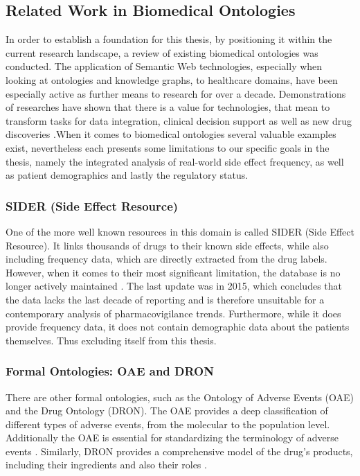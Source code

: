 \subsection{Related Work in Biomedical Ontologies}
In order to establish a foundation for this thesis, by positioning it within the current research landscape, a review of existing biomedical ontologies was conducted.  The application of Semantic Web technologies, especially when looking at ontologies and knowledge graphs, to healthcare domains, have been especially active as further means to research for over a decade. Demonstrations of researches have shown that there is a value for technologies, that mean to transform tasks for data integration, clinical decision support as well as new drug discoveries \cite{Daconta2003semanticWeb}.When it comes to biomedical ontologies several valuable examples exist, nevertheless each presents some limitations to our specific goals in the thesis, namely the integrated analysis of real-world side effect frequency, as well as patient demographics and lastly the regulatory status. 
\subsubsection*{SIDER (Side Effect Resource)}
One of the more well known resources in this domain is called SIDER (Side Effect Resource). It links thousands of drugs to their known side effects, while also including frequency data, which are directly extracted from the drug labels. However, when it comes to their most significant limitation, the database is no longer actively maintained \cite{EMBLsiderWebsite}. The last update was in 2015, which concludes that the data lacks the last decade of reporting and is therefore unsuitable for a contemporary analysis of pharmacovigilance trends. Furthermore, while it does provide frequency data, it does not contain demographic data about the patients themselves. Thus excluding itself from this thesis.
\subsubsection*{Formal Ontologies: OAE and DRON}
There are other formal ontologies, such as the Ontology of Adverse Events (OAE) and the Drug Ontology (DRON). The OAE provides a deep classification of different types of adverse events, from the molecular to the population level. Additionally the OAE is essential for standardizing the terminology of adverse events \cite{HeGroupOntobee}. Similarly, DRON provides a comprehensive model of the drug's products, including their ingredients and also their roles \cite{OBOFoundryDRON}.


